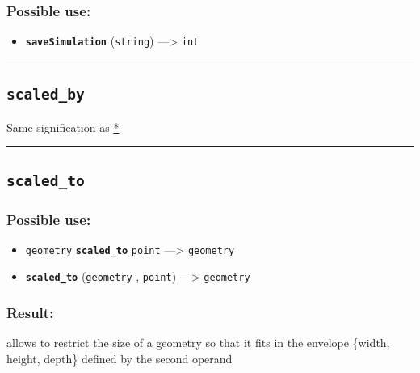 \documentclass[]{book}
\providecommand{\tightlist}{%
  \setlength{\itemsep}{0pt}\setlength{\parskip}{0pt}}
\theoremstyle{definition}
\theoremstyle{definition}
\theoremstyle{definition}
\theoremstyle{remark}
\begin{document}
\subsubsection{Possible use:}\label{possible-use-450}

\begin{itemize}
\tightlist
\item
  \textbf{\texttt{saveSimulation}} (\texttt{string}) ---\textgreater{}
  \texttt{int}
\end{itemize}

\begin{center}\rule{0.5\linewidth}{\linethickness}\end{center}

\subsection{\texorpdfstring{\texttt{scaled\_by}}{scaled\_by}}\label{scaled_by}

Same signification as \href{OperatorsAA\#*}{*}

\begin{center}\rule{0.5\linewidth}{\linethickness}\end{center}

\subsection{\texorpdfstring{\texttt{scaled\_to}}{scaled\_to}}\label{scaled_to}

\subsubsection{Possible use:}\label{possible-use-451}

\begin{itemize}
\tightlist
\item
  \texttt{geometry} \textbf{\texttt{scaled\_to}} \texttt{point}
  ---\textgreater{} \texttt{geometry}
\item
  \textbf{\texttt{scaled\_to}} (\texttt{geometry} , \texttt{point})
  ---\textgreater{} \texttt{geometry}
\end{itemize}

\subsubsection{Result:}\label{result-436}

allows to restrict the size of a geometry so that it fits in the
envelope \{width, height, depth\} defined by the second operand
\end{document}
